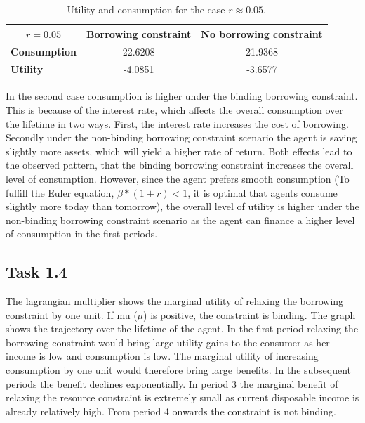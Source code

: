 \documentclass[a4paper, 12pt]{article}
\begin{document}
\begin{table}[H]
\centering
\begin{tabular}{l|cc}
\multicolumn{1}{c|}{\textbf{$r = 0.05 $}} & \multicolumn{1}{c}{\textbf{Borrowing constraint}} & \multicolumn{1}{c}{\textbf{No borrowing constraint}} \\ \hline
\textbf{Consumption}                      & 22.6208                                           & 21.9368                                              \\
\textbf{Utility}                          & -4.0851                                           & -3.6577                                             
\end{tabular}
\caption{Utility and consumption for the case $r \approx 0.05$.}
\label{table:r0005}
\end{table}

In the second case consumption is higher under the binding borrowing constraint. This is because of the interest rate, which affects the overall consumption over the lifetime in two ways. First, the interest rate increases the cost of borrowing. Secondly under the non-binding borrowing constraint scenario the agent is saving slightly more assets, which will yield a higher rate of return. Both effects lead to the observed pattern, that the binding borrowing constraint increases the overall level of consumption. However, since the agent prefers smooth consumption (To fulfill the Euler equation, $\beta*(1+r) < 1 $, it is optimal that agents consume slightly more today than tomorrow), the overall level of utility is higher under the non-binding borrowing constraint scenario as the agent can finance a higher level of consumption in the first periods. 

\subsection*{Task 1.4}

The lagrangian multiplier shows the marginal utility of relaxing the borrowing constraint by one unit. If mu ($\mu$) is positive, the constraint is binding. The graph shows the trajectory over the lifetime of the agent. In the first period relaxing the borrowing constraint would bring large utility gains to the consumer as her income is low and consumption is low. The marginal utility of increasing consumption by one unit would therefore bring large benefits. In the subsequent periods the benefit declines exponentially. In period 3 the marginal benefit of relaxing the resource constraint is extremely small as current disposable income is already relatively high. From period 4 onwards the constraint is not binding. 
\end{document}

